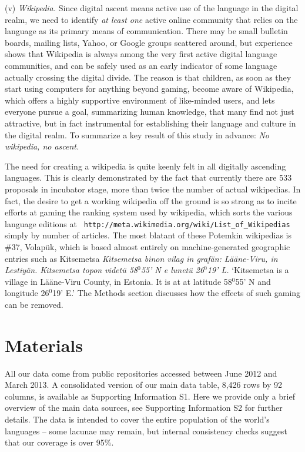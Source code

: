 \documentclass[10pt]{article}
\begin{document}
\medskip
(v) {\it Wikipedia.} Since digital {\color{black} ascent} means active use of the language
in the digital realm, we need to identify {\it at least one} active online community
that relies on the language as its primary means of communication. There may
be small bulletin boards, mailing lists, Yahoo, or Google groups scattered
around, but experience shows that Wikipedia is always among the very first
active digital language communities, and can be safely used as an early
indicator of some language actually crossing the digital divide. The reason is
that children, as soon as they start using computers for anything beyond
gaming, become aware of Wikipedia, which offers a highly supportive
environment of like-minded users, and lets everyone pursue a goal, summarizing
human knowledge, that many find not just attractive, but in fact instrumental
for establishing their language and culture in the digital realm. To summarize
a key result of this study in advance: {\it No wikipedia, no {\color{black} ascent}.}

The need for creating a wikipedia is quite keenly felt in all digitally
{\color{black} ascending} languages. This is clearly demonstrated by the fact that currently
there are 533 proposals in incubator stage, more than twice the number of
actual wikipedias.  In fact, the desire to get a working wikipedia off the
ground is so strong as to incite efforts at gaming the ranking system used by
wikipedia, which sorts the various language editions at {\tt
  http://meta.wikimedia.org/wiki/List\_of\_Wikipedias} simply by number of
articles. The most blatant of these Potemkin wikipedias is \#37, Volap\"{u}k,
which is based almost entirely on machine-generated geographic entries such as
{\sc Kitsemetsa} {\it Kitsemetsa binon vilag in graf\"an: L\"a\"ane-Viru, in
  Lestiy\"an. Kitsemetsa topon videt\"u 58$^0$55' N e lunet\"u 26$^0$19' L.}
{\color{black} `Kitsemetsa is a village in L\"a\"ane-Viru County, in Estonia. It
  is at at latitude 58$^0$55' N and longitude 26$^0$19' E.' The Methods
  section discusses how  the effects of   such gaming can be removed.}

\section*{Materials}

All our data come from public repositories accessed between June 2012 and
March 2013. A consolidated version of our main data table, 8,426 rows by 92
columns, is available as Supporting Information S1. Here we provide only a
brief overview of the main data sources, see Supporting Information S2 for
further details. The data is intended to cover the entire population of the
world's languages -- some lacunae may remain, but internal consistency checks
suggest that our coverage is over 95\%.
\end{document}
